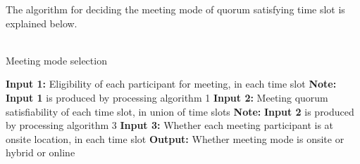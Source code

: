 The algorithm for deciding the meeting mode of quorum satisfying time slot is explained below.\\ \\
\begin{algorithm}[H]
    \caption{Meeting mode selection}
    \begin{algorithmic}
        \State \textbf{Input 1:} Eligibility of each participant for meeting, in each time slot
        \State \textbf{Note:} \textbf{Input 1} is produced by processing algorithm 1
        \State \textbf{Input 2:} Meeting quorum satisfiability of each time slot, in union of time slots
        \State \textbf{Note:} \textbf{Input 2} is produced by processing algorithm 3
        \State \textbf{Input 3:} Whether each meeting participant is at onsite location, in each time slot
        \State \textbf{Output:} Whether meeting mode is onsite or hybrid or online \\


\end{algorithmic}
\end{algorithm}

